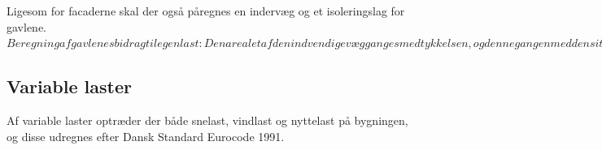 Ligesom for facaderne skal der også påregnes en indervæg og et isoleringslag for gavlene.
\newline
\newline
$Beregning af gavlenes bidrag til egenlast: 
Den arealet af den indvendige væg ganges med tykkelsen, og denne gangen med densiteten for en mursten, som antages til at væres 1500 kg/m^3 (http://www.mur-tag.dk/index.php?id=368). Dernæst omregnes vægten til kN og ganges med 2, da der er to gavle.
….Indsæt beregning for indvendig væg af gavl.
Isoleringen regnes på samme måde, denne gang med en anden tykkelse og densitet. Densiten af isoleringen antages til at være 30 kg/m^3 (http://www.rockwool.dk/produkter/u/7429/bygningsisolering/bd-60-flexibatts). 
Det endelige ganges igen med 2. 
…...indsæt beregning for isolering  i gavl.
Beregning af facadernes bidrag til egenlast:
Fremgangsmåden er her den samme som ved gavlenes last, forskellen er kun arealet som her er 181.175m^2
….. Indsæt kun resultat????$

\subsection{Variable laster}
Af variable laster optræder der både snelast, vindlast og nyttelast på bygningen, og disse udregnes efter Dansk Standard Eurocode 1991.

